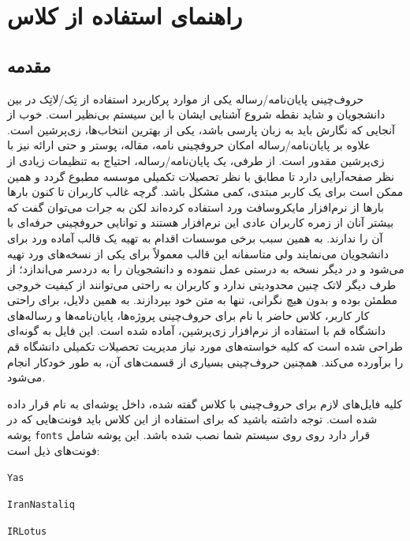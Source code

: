     \chapter{راهنمای استفاده از کلاس }
    \section{مقدمه}
    حروف‌چینی پایان‌نامه/رساله یکی از موارد پرکاربرد استفاده از تِک/لاتِک در بین دانشجویان و شاید نقطه شروع آشنایی ایشان با این سیستم بی‌نظیر است. 
    خوب از آنجایی که نگارش باید به زبان پارسی باشد، یکی از بهترین انتخاب‌ها، زی‌پرشین است. علاوه بر پایان‌نامه/رساله امکان حروفچینی نامه، 
    مقاله، پوستر و حتی ارائه نیز با زی‌پرشین مقدور است. از طرفی، یک  پایان‌نامه/رساله،  احتیاج به تنظیمات زیادی از نظر صفحه‌آرایی  دارد 
    تا مطابق با نظر تحصیلات تکمیلی موسسه مطبوع گردد و همین ممکن است برای
    یک کاربر مبتدی، کمی مشکل باشد. گرچه غالب کاربران تا کنون بارها بارها از نرم‌افزار مایکروسافت ورد استفاده کرده‌اند لکن به جرات 
    می‌توان گفت که بیشتر آنان از زمره کاربران عادی این نرم‌افزار هستند و توانایی حروفچینی حرفه‌ای با آن را ندارند. به همین سبب برخی موسسات 
    اقدام به تهیه یک قالب آماده ورد برای دانشجویان می‌نمایند ولی متاسفانه این قالب معمولاً برای یکی از نسخه‌های ورد تهیه می‌شود و در دیگر نسخه 
    به درستی عمل ننموده و دانشجویان را به دردسر می‌اندازد؛ از طرف دیگر لاتک چنین محدودیتی ندارد و کاربران به راحتی می‌توانند از کیفیت خروجی 
    مطمئن بوده و بدون هیچ نگرانی، تنها به متن خود بپردازند. 
    به همین دلایل، برای راحتی کار کاربر، کلاس حاضر با نام 
     برای حروف‌چینی پروژه‌ها، پایان‌نامه‌ها و رساله‌های دانشگاه قم با استفاده از نرم‌افزار زی‌پرشین،  آماده شده است. این فایل به 
    گونه‌ای طراحی شده است که کلیه خواسته‌های مورد نیاز  مدیریت تحصیلات تکمیلی دانشگاه قم را برآورده می‌کند. همچنین حروف‌چینی بسیاری
    از قسمت‌های آن، به طور خودکار انجام می‌شود.

    کلیه فایل‌های لازم برای حروف‌چینی با کلاس گفته شده، داخل پوشه‌ای به نام
      قرار داده شده است. توجه داشته باشید که برای استفاده از این کلاس باید فونت‌هایی که در پوشه \Verb+fonts+ قرار دارد روی 
        روی سیستم شما نصب شده باشد. این پوشه شامل فونت‌های ذیل است:‌
        \begin{enumerate*}
            \item \Verb+Yas+
            \item {}
             \item \Verb+IranNastaliq+
            \item \Verb+IRLotus+
            \item {}
            \item {}
        \end{enumerate*}
        
